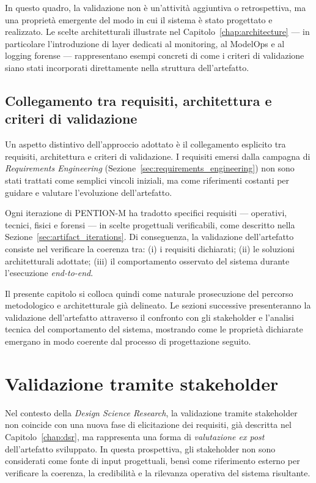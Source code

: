 In questo quadro, la validazione non è un’attività aggiuntiva o retrospettiva, ma una proprietà emergente del modo in cui il sistema è stato progettato e realizzato.
Le scelte architetturali illustrate nel Capitolo~\ref{chap:architecture} — in particolare l’introduzione di layer dedicati al monitoring, al ModelOps e al logging forense — rappresentano esempi concreti di come i criteri di validazione siano stati incorporati direttamente nella struttura dell’artefatto.

\subsection*{Collegamento tra requisiti, architettura e criteri di validazione}

Un aspetto distintivo dell’approccio adottato è il collegamento esplicito tra requisiti, architettura e criteri di validazione.
I requisiti emersi dalla campagna di \emph{Requirements Engineering} (Sezione~\ref{sec:requirements_engineering}) non sono stati trattati come semplici vincoli iniziali, ma come riferimenti costanti per guidare e valutare l’evoluzione dell’artefatto.

Ogni iterazione di \textsc{PENTION-M} ha tradotto specifici requisiti — operativi, tecnici, fisici e forensi — in scelte progettuali verificabili, come descritto nella Sezione~\ref{sec:artifact_iterations}.
Di conseguenza, la validazione dell’artefatto consiste nel verificare la coerenza tra:
(i) i requisiti dichiarati;
(ii) le soluzioni architetturali adottate;
(iii) il comportamento osservato del sistema durante l’esecuzione \textit{end-to-end}.

Il presente capitolo si colloca quindi come naturale prosecuzione del percorso metodologico e architetturale già delineato.
Le sezioni successive presenteranno la validazione dell’artefatto attraverso il confronto con gli stakeholder e l’analisi tecnica del comportamento del sistema, mostrando come le proprietà dichiarate emergano in modo coerente dal processo di progettazione seguito.

\section{Validazione tramite stakeholder}
\label{sec:validation_stakeholders}

Nel contesto della \emph{Design Science Research}, la validazione tramite stakeholder non coincide con una nuova fase di elicitazione dei requisiti, già descritta nel Capitolo~\ref{chap:dsr}, ma rappresenta una forma di \emph{valutazione ex post} dell’artefatto sviluppato.
In questa prospettiva, gli stakeholder non sono considerati come fonte di input progettuali, bensì come riferimento esterno per verificare la coerenza, la credibilità e la rilevanza operativa del sistema risultante.

